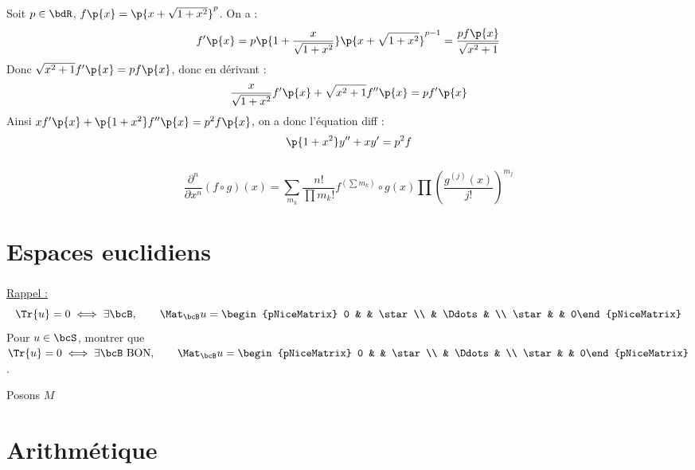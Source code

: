 \documentclass[a4paper,french,bookmarks]{book}
\begin{document}
    Soit $p \in \bdR$, $f\p{x} = \p{x + \sqrt{1 + x^2}}^p$. On a :
    \[f'\p{x} = p\p{1 + \dfrac{x}{\sqrt{1 + x^2}}}\p{x + \sqrt{1 + x^2}}^{p-1} = \dfrac{pf\p{x}}{\sqrt{x^2 + 1}}\]
    Donc $\sqrt{x^2 + 1}f'\p{x} = pf\p{x}$, donc en dérivant :
    \[ \dfrac{x}{\sqrt{1 + x^2}}f'\p{x} + \sqrt{x^2 + 1}f''\p{x} = pf'\p{x}\]
    Ainsi $xf'\p{x} + \p{1 + x^2}f''\p{x} = p^2f\p{x}$, on a donc l'équation diff :
    \[ \p{1 + x^2}y'' + xy' = p^2f\]
    
    
    \subsection{}

    \begin{equation}
        \dfrac{\partial^n}{\partial x^n}\left(f\circ g\right)(x) = \sum_{m_k} \dfrac{n!}{\prod m_k!} f^{(\sum m_k)}\circ g(x) \prod \left(\dfrac{g^{(j)}(x)}{j!}\right)^{m_j}
    \end{equation}
    
    \newpage
    
    \chapter{Espaces euclidiens}
    
    \subsection{}
    
    \underline{Rappel :} 
    \[ \Tr{u} = 0 \iff \exists \bcB,\qquad \Mat_\bcB u = \begin{pNiceMatrix} 0 & & \star \\
     & \Ddots & \\
    \star & & 0\end{pNiceMatrix} \]
    Pour $u \in \bcS$, montrer que $\Tr{u} = 0 \iff \exists \bcB \ \text{BON},\qquad \Mat_\bcB u =  \begin{pNiceMatrix} 0 & & \star \\
     & \Ddots & \\
    \star & & 0\end{pNiceMatrix}$.
    
    \newpage
    
    Posons $M $

    \chapter{Arithmétique}
\end{document}
